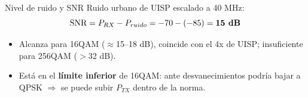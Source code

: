 \begin{frame}{Nivel de ruido y SNR}
  Ruido urbano de UISP escalado a 40 MHz: \EBruido
  \[
    \text{SNR} = P_{RX} - P_{ruido} = -70 - (-85) = \textbf{15 dB}
  \]
  \begin{itemize}
    \item Alcanza para 16QAM ($\approx$15--18 dB), coincide con el 4x de UISP;
          insuficiente para 256QAM ($>$32 dB).
    \item Está en el \textbf{límite inferior} de 16QAM: ante desvanecimientos podría bajar a
          QPSK $\Rightarrow$ se puede subir $P_{TX}$ dentro de la norma.
  \end{itemize}
  \vspace{4pt}
  \begin{center}
  \end{center}
\end{frame}

